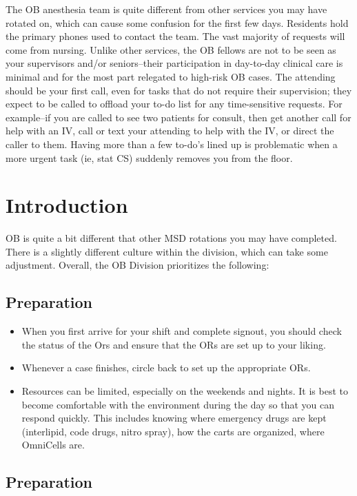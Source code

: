 \documentclass[twoside,8pt]{extarticle}
\providecommand{\tightlist}{%
}
\begin{document}
The OB anesthesia team is quite different from other services you may
have rotated on, which can cause some confusion for the first few days.
Residents hold the primary phones used to contact the team. The vast
majority of requests will come from nursing. Unlike other services, the
OB fellows are not to be seen as your supervisors and/or seniors--their
participation in day-to-day clinical care is minimal and for the most
part relegated to high-risk OB cases. The attending should be your first
call, even for tasks that do not require their supervision; they expect
to be called to offload your to-do list for any time-sensitive requests.
For example--if you are called to see two patients for consult, then get
another call for help with an IV, call or text your attending to help
with the IV, or direct the caller to them. Having more than a few
to-do's lined up is problematic when a more urgent task (ie, stat CS)
suddenly removes you from the floor.

\section{Introduction}\label{introduction-1}

OB is quite a bit different that other MSD rotations you may have
completed. There is a slightly different culture within the division,
which can take some adjustment. Overall, the OB Division prioritizes the
following:

\subsection{Preparation}\label{preparation}

\begin{itemize}
\tightlist
\item
  When you first arrive for your shift and complete signout, you should
  check the status of the Ors and ensure that the ORs are set up to your
  liking.
\item
  Whenever a case finishes, circle back to set up the appropriate ORs.
\item
  Resources can be limited, especially on the weekends and nights. It is
  best to become comfortable with the environment during the day so that
  you can respond quickly. This includes knowing where emergency drugs
  are kept (interlipid, code drugs, nitro spray), how the carts are
  organized, where OmniCells are.
\end{itemize}

\subsection{Preparation}\label{preparation-1}
\end{document}
